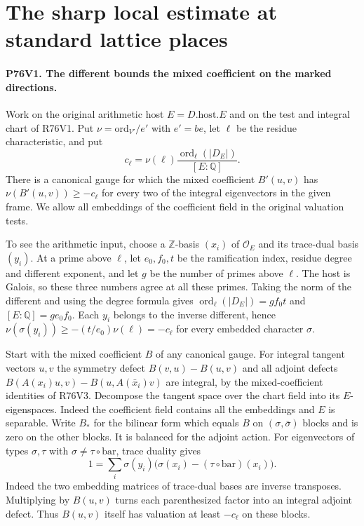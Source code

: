\section{The sharp local estimate at standard lattice places}

\paragraph{P76V1. The different bounds the mixed coefficient on the marked directions.}
Work on the original arithmetic host $E=D.\mathrm{host}.E$ and on
the test and integral chart of R76V1. Put $\nu=\mathrm{ord}_{V'}/e'$
with $e'=be$, let $\ell$ be the residue characteristic, and put
\[
 c_\ell=\nu(\ell)\frac{\operatorname{ord}_\ell(|D_E|)}
                             {[E:\mathbb Q]}.
\]
There is a canonical gauge for which the mixed coefficient
$B'(u,v)$ has $\nu(B'(u,v))\ge-c_\ell$ for every two of the
integral eigenvectors in the given frame. We allow all embeddings
of the coefficient field in the original valuation tests.

To see the arithmetic input, choose a $\mathbb Z$-basis $(x_i)$
of $\mathcal O_E$ and its trace-dual basis $(y_i)$. At a prime
above $\ell$, let $e_0,f_0,t$ be the ramification index, residue
degree and different exponent, and let $g$ be the number of primes
above $\ell$. The host is Galois, so these three numbers agree at
all these primes. Taking the norm of the different and using the
degree formula gives $\operatorname{ord}_\ell(|D_E|)=gf_0t$ and
$[E:\mathbb Q]=ge_0f_0$. Each $y_i$ belongs to the inverse
different, hence $\nu(\sigma(y_i))\ge-(t/e_0)\nu(\ell)=-c_\ell$
for every embedded character $\sigma$.

Start with the mixed coefficient $B$ of any canonical gauge.
For integral tangent vectors $u,v$ the symmetry defect
$B(v,u)-B(u,v)$ and all adjoint defects
$B(A(x_i)u,v)-B(u,A(\bar x_i)v)$ are integral, by the
mixed-coefficient identities of R76V3. Decompose the tangent
space over the chart field into its $E$-eigenspaces. Indeed the
coefficient field contains all the embeddings and $E$ is
separable. Write $B_*$ for the bilinear form which equals $B$
on $(\sigma,\bar\sigma)$ blocks and is zero on the other blocks.
It is balanced for the adjoint action. For eigenvectors of types
$\sigma,\tau$ with $\sigma\ne\tau\circ\mathrm{bar}$, trace
duality gives
\[
 1=\sum_i\sigma(y_i)
              \bigl(\sigma(x_i)-(\tau\circ\mathrm{bar})(x_i)\bigr).
\]
Indeed the two embedding matrices of trace-dual bases are inverse
transposes. Multiplying by $B(u,v)$ turns each parenthesized
factor into an integral adjoint defect. Thus $B(u,v)$ itself has
valuation at least $-c_\ell$ on these blocks.

